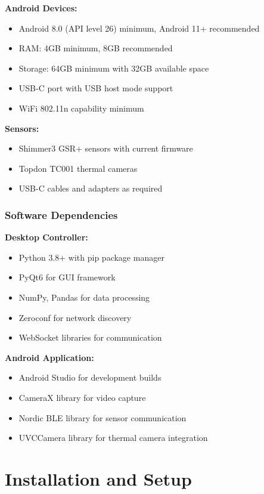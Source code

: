 \textbf{Android Devices:}
\begin{itemize}
\item Android 8.0 (API level 26) minimum, Android 11+ recommended
\item RAM: 4GB minimum, 8GB recommended
\item Storage: 64GB minimum with 32GB available space
\item USB-C port with USB host mode support
\item WiFi 802.11n capability minimum
\end{itemize}

\textbf{Sensors:}
\begin{itemize}
\item Shimmer3 GSR+ sensors with current firmware
\item Topdon TC001 thermal cameras
\item USB-C cables and adapters as required
\end{itemize}

\subsubsection{Software Dependencies}

\textbf{Desktop Controller:}
\begin{itemize}
\item Python 3.8+ with pip package manager
\item PyQt6 for GUI framework
\item NumPy, Pandas for data processing
\item Zeroconf for network discovery
\item WebSocket libraries for communication
\end{itemize}

\textbf{Android Application:}
\begin{itemize}
\item Android Studio for development builds
\item CameraX library for video capture
\item Nordic BLE library for sensor communication
\item UVCCamera library for thermal camera integration
\end{itemize}

\section{Installation and Setup}

